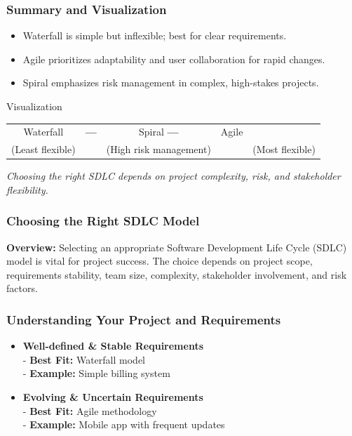 \documentclass{beamer}
\begin{document}
\begin{frame}[fragile]
  \frametitle{Summary and Visualization}
  
  \begin{itemize}
    \item Waterfall is simple but inflexible; best for clear requirements.
    \item Agile prioritizes adaptability and user collaboration for rapid changes.
    \item Spiral emphasizes risk management in complex, high-stakes projects.
  \end{itemize}
  
  \begin{block}{Visualization}
    \begin{center}
      \begin{tabular}{c c c}
        Waterfall & \textbf{---} & Spiral \textbf{---} & Agile \\
        (Least flexible) && (High risk management) && (Most flexible)
      \end{tabular}
    \end{center}
  \end{block}
  
  \smallskip
  \textit{Choosing the right SDLC depends on project complexity, risk, and stakeholder flexibility.}
\end{frame}

\begin{frame}[fragile]
  \frametitle{Choosing the Right SDLC Model}
  \textbf{Overview:} Selecting an appropriate Software Development Life Cycle (SDLC) model is vital for project success. The choice depends on project scope, requirements stability, team size, complexity, stakeholder involvement, and risk factors.
\end{frame}

\begin{frame}[fragile]
  \frametitle{Understanding Your Project and Requirements}
  \begin{itemize}
    \item \textbf{Well-defined & Stable Requirements} \\
    \quad - \textbf{Best Fit:} Waterfall model \\
    \quad - \textbf{Example:} Simple billing system \\
    \item \textbf{Evolving & Uncertain Requirements} \\
    \quad - \textbf{Best Fit:} Agile methodology \\
    \quad - \textbf{Example:} Mobile app with frequent updates
  \end{itemize}
\end{frame}
\end{document}
